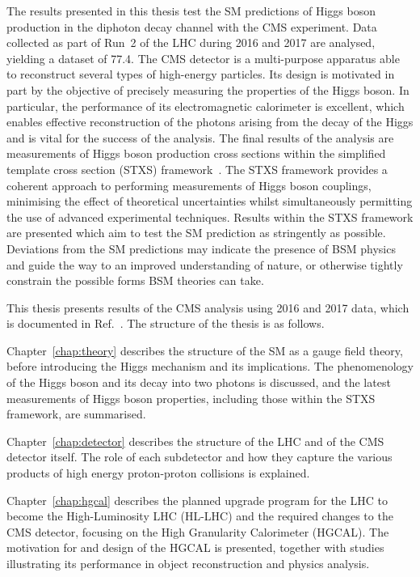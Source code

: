 The results presented in this thesis test the SM predictions of Higgs boson production
in the diphoton decay channel with the CMS experiment.
Data collected as part of Run~2 of the LHC during 2016 and 2017 are analysed, 
yielding a dataset of \SI{77.4}{\fbinv}.
The CMS detector is a multi-purpose apparatus able to reconstruct several types of high-energy particles.
Its design is motivated in part by the objective of precisely measuring the properties of the Higgs boson.
In particular, the performance of its electromagnetic calorimeter is excellent, 
which enables effective reconstruction of the photons arising from the decay of the Higgs 
and is vital for the success of the \Hgg analysis.
The final results of the analysis are measurements of Higgs boson production cross sections
within the simplified template cross section (STXS) framework~\cite{YR4}.
The STXS framework provides a coherent approach to performing measurements of Higgs boson couplings, 
minimising the effect of theoretical uncertainties 
whilst simultaneously permitting the use of advanced experimental techniques.
Results within the STXS framework are presented
which aim to test the SM prediction as stringently as possible.
Deviations from the SM predictions may indicate the presence of BSM physics 
and guide the way to an improved understanding of nature, 
or otherwise tightly constrain the possible forms BSM theories can take.

This thesis presents results of the CMS \Hgg analysis using 2016 and 2017 data, 
which is documented in Ref.~\cite{HIG-18-029}.
The structure of the thesis is as follows.

Chapter~\ref{chap:theory} describes the structure of the SM as a gauge field theory, 
before introducing the Higgs mechanism and its implications.
The phenomenology of the Higgs boson and its decay into two photons is discussed, 
and the latest measurements of Higgs boson properties, including those within the STXS framework, 
are summarised.

Chapter~\ref{chap:detector} describes the structure of the LHC and of the CMS detector itself.
The role of each subdetector and how they capture the various products 
of high energy proton-proton collisions is explained.

Chapter~\ref{chap:hgcal} describes the planned upgrade program for the LHC to become the High-Luminosity LHC (HL-LHC) 
and the required changes to the CMS detector, focusing on the High Granularity Calorimeter (HGCAL).
The motivation for and design of the HGCAL is presented, 
together with studies illustrating its performance in object reconstruction and physics analysis.

